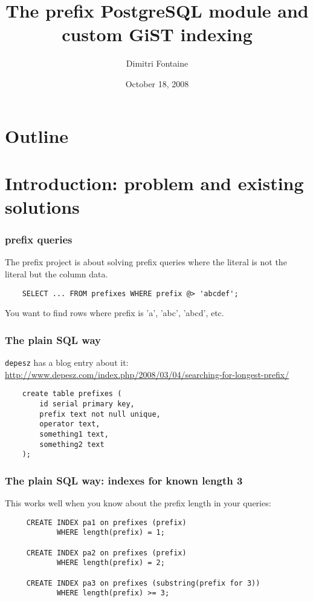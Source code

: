 \documentclass{beamer}
\title{The prefix PostgreSQL module and custom GiST indexing}
\author{Dimitri Fontaine}
\date{October 18, 2008}
\begin{document}
\frame{\titlepage}

\section*{Outline}

\section{Introduction: problem and existing solutions}

\begin{frame}[fragile]
  \frametitle{prefix queries}

  The \alert{prefix} project is about solving prefix queries where the
  literal is not the literal but the column data.

  \begin{example}
  \begin{verbatim}
    SELECT ... FROM prefixes WHERE prefix @> 'abcdef';
  \end{verbatim}
  \end{example}

  You want to find rows where prefix is 'a', 'abc', 'abcd', etc.
\end{frame}

\begin{frame}[fragile]
  \frametitle{The plain SQL way}
  
  \texttt{depesz} has a blog entry about it:
  \url{http://www.depesz.com/index.php/2008/03/04/searching-for-longest-prefix/}
  
  \begin{example}
  \begin{verbatim}
    create table prefixes (
        id serial primary key,
        prefix text not null unique,
        operator text,
        something1 text,
        something2 text
    );
  \end{verbatim}
  \end{example}
\end{frame}
  
\begin{frame}[fragile]
  \frametitle{The plain SQL way: indexes for known length 3}

  This works well when you know about the prefix length in your queries:

  \begin{example}
  \begin{verbatim}
     CREATE INDEX pa1 on prefixes (prefix) 
            WHERE length(prefix) = 1;

     CREATE INDEX pa2 on prefixes (prefix)
            WHERE length(prefix) = 2;

     CREATE INDEX pa3 on prefixes (substring(prefix for 3))
            WHERE length(prefix) >= 3;
  \end{verbatim}
  \end{example}
\end{frame}
\end{document}
